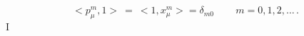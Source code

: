 \begin{equation}
< p^m_\mu , 1 > \  = \ < 1 , x^m_\mu > = \delta_{m 0}\,\qquad m =
0 , 1, 2 ,\dots\, .\label{408}\end{equation}I
